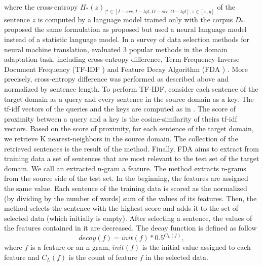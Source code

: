 where the cross-entropy $H_{*}(z)_{| * \in [I-src, I-tgt, O-src, O-tgt], z \in [x,y]}$ of the sentence $z$ is computed by a language model trained only with the corpus $D_{*}$. \citet{Duh13adaptation} proposed the same formulation as proposed \citet{Axelrod11domain} but used a neural language model instead of a statistic language model. In a survey of data selection methods for neural machine translation, \citet{Silva18extracting} evaluated 3 popular methods in the domain adaptation task, including cross-entropy difference, Term Frequency-Inverse Document Frequency (TF-IDF ) \citep{Salton73On} and Feature Decay Algorithm (FDA ) \citep{Poncelas18Feature}. More precisely, cross-entropy difference was performed as described above and normalized by sentence length. To perform TF-IDF, \citet{Silva18extracting} consider each sentence of the target domain as a query and every sentence in the source domain as a key. The tf-idf vectors of the queries and the keys are computed as in \citet{Salton73On}. The score of proximity between a query and a key is the cosine-similarity of theirs tf-idf vectors. Based on the score of proximity, for each sentence of the target domain, we retrieve K nearest-neighbors in the source domain. The collection of the retrieved sentences is the result of the method. Finally, FDA aims to extract from training data a set of sentences that are most relevant to the test set of the target domain. We call an extracted n-gram a feature. The method extracts n-grams from the source side of the test set. In the beginning, the features are assigned the same value. Each sentence of the training data is scored as the normalized (by dividing by the number of words) sum of the values of its features. Then, the method selects the sentence with the highest score and adds it to the set of selected data (which initially is empty). After selecting a sentence, the values of the features contained in it are decreased. The decay function is defined as follow
\begin{equation}
decay(f) = init(f) * 0.5 ^{C_{L}(f)},
\end{equation}
where $f$ is a feature or an n-gram, $init(f)$ is the initial value assigned to each feature and $C_{L}(f)$ is the count of feature $f$ in the selected data.


